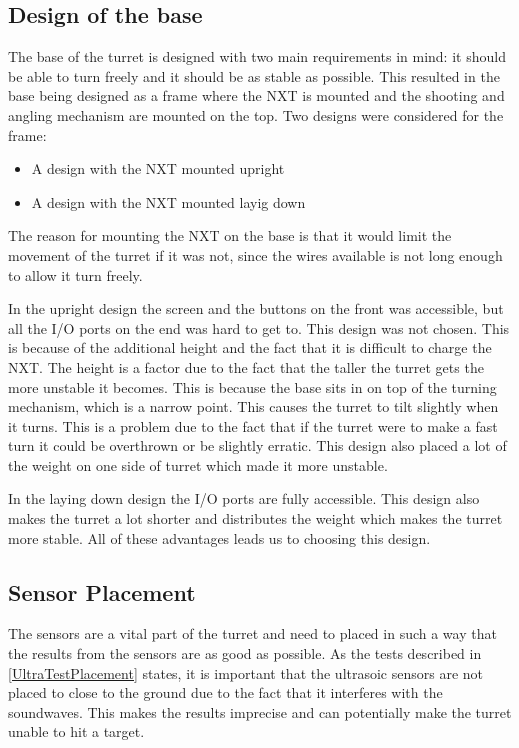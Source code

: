 \subsection{Design of the base}
The base of the turret is designed with two main requirements in mind: it should
be able to turn freely and it should be as stable as possible. This resulted
in the base being designed as a frame where the NXT is mounted and the shooting
and angling mechanism are mounted on the top. Two designs were considered for the frame: 

\begin{itemize}
  \item A design with the NXT mounted upright
  \item A design with the NXT mounted layig down
\end{itemize}

The reason for mounting the NXT on the base is that it would limit the movement
of the turret if it was not, since the wires available is not long enough to
allow it turn freely.\nl

In the upright design the screen and the buttons on the front
was accessible, but all the I/O ports on the end was hard to get to. This
design was not chosen. This is because of the additional height and the fact
that it is difficult to charge the NXT. The height is a factor due to the fact
that the taller the turret gets the more unstable it becomes. This is because
the base sits in on top of the turning mechanism, which is a narrow point. This
causes the turret to tilt slightly when it turns. This is a problem due to the
fact that if the turret were to make a fast turn it could be overthrown or be
slightly erratic. This design also placed a lot of the weight on one side of
turret which made it more unstable.\nl

In the laying down design the I/O ports are fully accessible. This design also makes the turret a
lot shorter and distributes the weight which makes the turret more stable. All
of these advantages leads us to choosing this design.

\subsection{Sensor Placement}
The sensors are a vital part of the turret and need to placed in such a way that
the results from the sensors are as good as possible. As the tests described in
\autoref{UltraTestPlacement} states, it is important that the ultrasoic sensors
are not placed to close to the ground due to the fact that it interferes with
the soundwaves. This makes the results imprecise and can potentially make the
turret unable to hit a target.\nl

